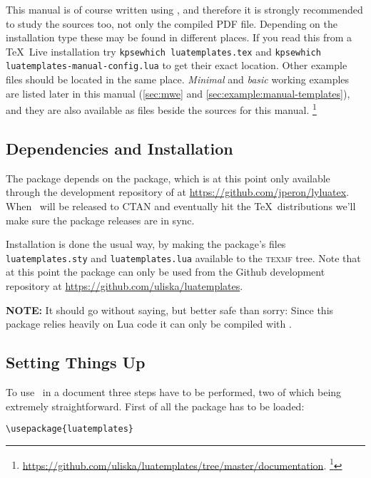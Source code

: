 \documentclass[12pt]{scrartcl}
\begin{document}
This manual is of course written using \luatemplates, and therefore it
is strongly recommended to study the sources too, not only the compiled PDF
file.  Depending on the installation type these may be found in different
places.  If you read this from a \TeX\ Live installation try \texttt{kpsewhich
luatemplates.tex} and \texttt{kpsewhich luatemplates-manual-config.lua} to get
their exact location.  Other example files should be located in the same place.
\emph{Minimal} and \emph{basic} working examples are listed later in this manual
(\vref{sec:mwe} and \vref{sec:example:manual-templates}), and they are also available
as files beside the sources for this manual.%
\footnote{\url{https://github.com/uliska/luatemplates/tree/master/documentation}.%
\footnote{\textbf{TODO:} Clarify where they end up in TeX Live.}}

\subsection{Dependencies and Installation}
\label{sec:dependencies-and-installation}

The package depends on the  package, which is at this
point only available through the development repository of  at
\url{https://github.com/jperon/lyluatex}.  When \luatemplates\ will be
released to CTAN and eventually hit the \TeX\ distributions we'll make sure the
package releases are in sync.

Installation is done the usual way, by making the package's files
\texttt{luatemplates.sty} and \texttt{luatemplates.lua} available to the
\textsc{texmf} tree. Note that at this point the package can only be used from
the Github development repository at
\url{https://github.com/uliska/luatemplates}.

\textbf{NOTE:} It should go without saying, but better safe than sorry: Since
this package relies heavily on Lua code it can only be compiled with
.


\subsection{Setting Things Up}
\label{sec:setup}

To use \luatemplates\ in a document three steps have to be performed,
two of which being extremely straightforward. First of all the package
has to be loaded:

\begin{verbatim}
\usepackage{luatemplates}
\end{verbatim}
\end{document}
